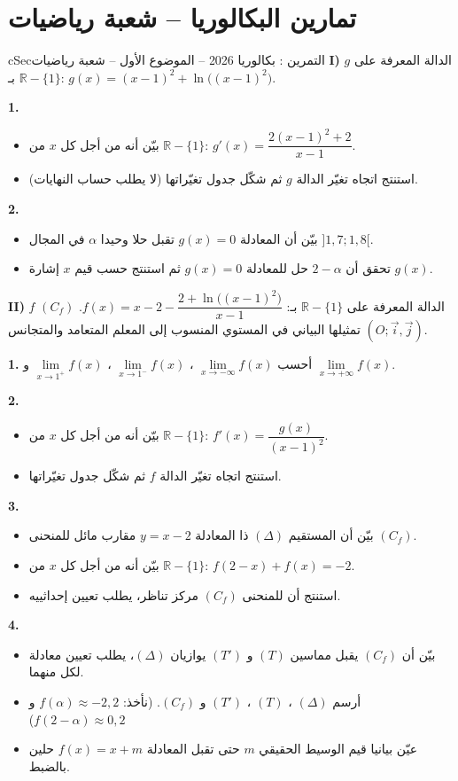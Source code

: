 \documentclass[12pt,a4paper]{article}
\newenvironment{BOX}[2]{\begin{otherlanguage}{english}\begin{arbox}{#1}{#2}}{\end{arbox}\end{otherlanguage}}
\newcounter{exo}
\newenvironment{tamrin}[1]{\stepcounter{exo}\begin{BOX}{cSec}{التمرين \theexo: #1}}{\end{BOX}}
\newcommand{\R}{\mathbb{R}}
\newenvironment{sq}{\begin{itemize}[leftmargin=2.4em,itemsep=3pt]}{\end{itemize}}
\newcommand{\qa}{\item[(أ)]}\newcommand{\qb}{\item[(ب)]}\newcommand{\qc}{\item[(جـ)]}\newcommand{\qd}{\item[(د)]}\newcommand{\qe}{\item[(هـ)]}
\newcommand{\QQ}[1]{\par\smallskip\textbf{#1.} }
\begin{document}
\section{تمارين البكالوريا -- شعبة رياضيات}

\begin{tamrin}{بكالوريا 2026 -- الموضوع الأول -- شعبة رياضيات}
\textbf{I)} $g$ الدالة المعرفة على $\R-\{1\}$ بـ: $g(x)=(x-1)^2+\ln\big((x-1)^2\big)$.
\QQ{1}
\begin{sq}
\qa بيّن أنه من أجل كل $x$ من $\R-\{1\}$: $g'(x)=\dfrac{2(x-1)^2+2}{x-1}$.
\qb استنتج اتجاه تغيّر الدالة $g$ ثم شكّل جدول تغيّراتها (لا يطلب حساب النهايات).
\end{sq}
\QQ{2}
\begin{sq}
\qa بيّن أن المعادلة $g(x)=0$ تقبل حلا وحيدا $\alpha$ في المجال $]1{,}7;1{,}8[$.
\qb تحقق أن $2-\alpha$ حل للمعادلة $g(x)=0$ ثم استنتج حسب قيم $x$ إشارة $g(x)$.
\end{sq}

\textbf{II)} $f$ الدالة المعرفة على $\R-\{1\}$ بـ: $f(x)=x-2-\dfrac{2+\ln\big((x-1)^2\big)}{x-1}$.
$(C_f)$ تمثيلها البياني في المستوي المنسوب إلى المعلم المتعامد والمتجانس $(O;\vec i,\vec j)$.
\QQ{1} أحسب $\lim\limits_{x\to -\infty}f(x)$ ، $\lim\limits_{x\to 1^{-}}f(x)$ ، $\lim\limits_{x\to 1^{+}}f(x)$ و $\lim\limits_{x\to +\infty}f(x)$.
\QQ{2}
\begin{sq}
\qa بيّن أنه من أجل كل $x$ من $\R-\{1\}$: $f'(x)=\dfrac{g(x)}{(x-1)^2}$.
\qb استنتج اتجاه تغيّر الدالة $f$ ثم شكّل جدول تغيّراتها.
\end{sq}
\QQ{3}
\begin{sq}
\qa بيّن أن المستقيم $(\Delta)$ ذا المعادلة $y=x-2$ مقارب مائل للمنحنى $(C_f)$.
\qb بيّن أنه من أجل كل $x$ من $\R-\{1\}$: $f(2-x)+f(x)=-2$.
\qc استنتج أن للمنحنى $(C_f)$ مركز تناظر، يطلب تعيين إحداثييه.
\end{sq}
\QQ{4}
\begin{sq}
\qa بيّن أن $(C_f)$ يقبل مماسين $(T)$ و $(T')$ يوازيان $(\Delta)$، يطلب تعيين معادلة لكل منهما.
\qb أرسم $(\Delta)$ ، $(T)$ ، $(T')$ و $(C_f)$. (نأخذ: $f(\alpha)\approx -2{,}2$ و $f(2-\alpha)\approx 0{,}2$)
\qc عيّن بيانيا قيم الوسيط الحقيقي $m$ حتى تقبل المعادلة $f(x)=x+m$ حلين بالضبط.
\end{sq}
\end{tamrin}
\end{document}
